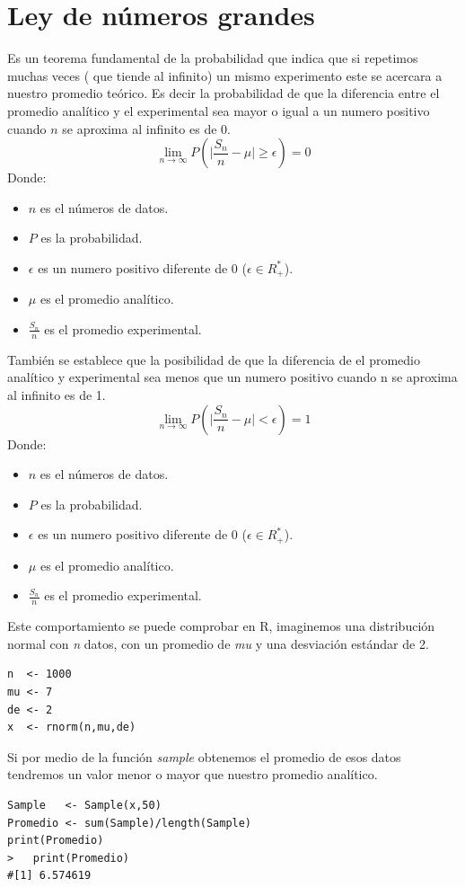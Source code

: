\documentclass[]{article}
\begin{document}
\section{Ley de números grandes}
Es un teorema fundamental de la probabilidad que indica que si repetimos muchas veces ( que tiende al infinito) un mismo experimento este se acercara a nuestro promedio teórico.
Es decir la probabilidad de que la diferencia entre el promedio analítico y el experimental sea mayor o igual a un numero positivo cuando $n$ se aproxima al infinito es de $0$.
\[ \lim_{n\to\infty} P(\lvert \frac{S_{n}}{n} - \mu \lvert \geq \epsilon) = 0\]
Donde:
\begin{itemize}
	\item $n$ es el números de datos.
	\item $P$ es la probabilidad.
	\item $\epsilon$ es un numero positivo diferente de 0 ($\epsilon \in R_{+}^{*}$).
    \item $\mu$ es el promedio analítico.
	\item $\frac{S_{n}}{n}$ es el promedio experimental.
\end{itemize}
También se establece que la posibilidad de que la diferencia de el promedio analítico y experimental sea menos que un numero positivo cuando n se aproxima al infinito es de 1.
\[ \lim_{n\to\infty} P(\lvert \frac{S_{n}}{n} - \mu \lvert < \epsilon) = 1\]
Donde:
\begin{itemize}
	\item $n$ es el números de datos.
	\item $P$ es la probabilidad.
	\item $\epsilon$ es un numero positivo diferente de 0 ($\epsilon \in R_{+}^{*}$).
    \item $\mu$ es el promedio analítico.
	\item $\frac{S_{n}}{n}$ es el promedio experimental.
\end{itemize}
Este comportamiento se puede comprobar en R\cite{rproject}, imaginemos una distribución normal con \textit{n}  datos, con un promedio de \textit{mu} y una desviación estándar de 2.
  \begin{lstlisting}
n  <- 1000
mu <- 7
de <- 2
x  <- rnorm(n,mu,de)
   \end{lstlisting}
Si por medio de la función \textit{sample} obtenemos el promedio de esos datos tendremos un valor menor o mayor que nuestro promedio analítico.
  \begin{lstlisting}
Sample   <- Sample(x,50)
Promedio <- sum(Sample)/length(Sample)
print(Promedio)
>   print(Promedio)
#[1] 6.574619

   \end{lstlisting}
\end{document}
